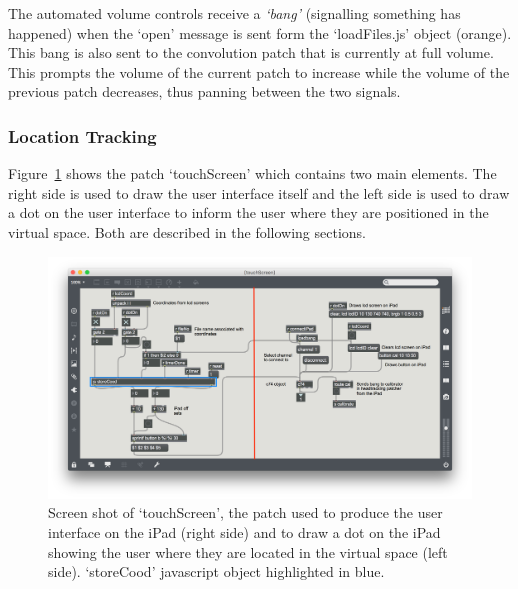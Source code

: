 \documentclass[../../main.tex]{subfiles}
\begin{document}
		 	The automated volume controls receive a \textit{`bang'} (signalling something has happened) when the `open' message is sent form the `loadFiles.js' object (orange). This bang is also sent to the convolution patch that is currently at full volume. This prompts the volume of the current patch to increase while the volume of the previous patch decreases, thus panning between the two signals.


	\subsubsection{Location Tracking}
	\label{locationtracking}
	Figure~\ref{touchScreenPatch} shows the patch `touchScreen' which contains two main elements. The right side is used to draw the user interface itself and the left side is used to draw a dot on the user interface to inform the user where they are positioned in the virtual space. Both are described in the following sections.

		\begin{figure}
			\centerline{\includegraphics[width=\textwidth]{Sections/Implementation/Max/images/Max/UserInterface/pTouchScreen_edit.png}}
			\caption{Screen shot of `touchScreen', the patch used to produce the user interface on the iPad (right side) and to draw a dot on the iPad showing the user where they are located in the virtual space (left side). `storeCood' javascript object highlighted in blue.}
			\label{touchScreenPatch}
		\end{figure}
\end{document}
